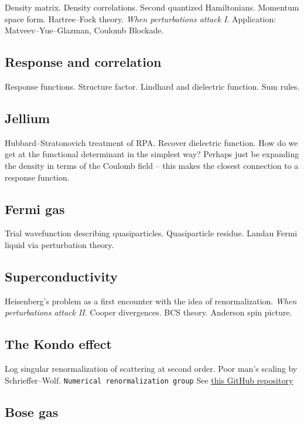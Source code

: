 Density matrix. Density correlations. Second quantized Hamiltonians. Momentum space form. Hartree--Fock theory. \emph{When perturbations attack I}. Application: Matveev--Yue--Glazman, Coulomb Blockade. 

\subsection{Response and correlation}

Response functions. Structure factor. Lindhard and dielectric function. Sum rules.

\subsection{Jellium}

Hubbard--Stratonovich treatment of RPA. Recover dielectric function. How do we get at the functional determinant in the simplest way? Perhaps just be expanding the density in terms of the Coulomb field -- this makes the closest connection to a response function.

\subsection{Fermi gas}

Trial wavefunction describing quasiparticles. Quasiparticle residue. Landau Fermi liquid via perturbation theory. 

\subsection{Superconductivity}

Heisenberg's problem as a first encounter with the idea of renormalization. \emph{When perturbations attack II}. Cooper divergences. BCS theory. Anderson spin picture.

\subsection{The Kondo effect}

Log singular renormalization of scattering at second order. Poor man's scaling by Schrieffer--Wolf. \verb|Numerical renormalization group| See \href{https://github.com/LucasNogueiraMartins/NRG-Didactic}{this GitHub repository}

\subsection{Bose gas}

